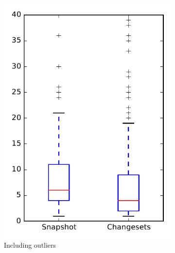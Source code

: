 
\begin{figure}
    \centering
    \begin{subfigure}{.4\textwidth}
        \centering
        \includegraphics[height=0.4\textheight]{figures/dit/rq1_mahout}
        \caption{Including outliers}\label{fig:dit:rq1:mahout_outlier}
    \end{subfigure}%
    \begin{subfigure}{.4\textwidth}
        \centering

\end{subfigure}
\end{figure}
